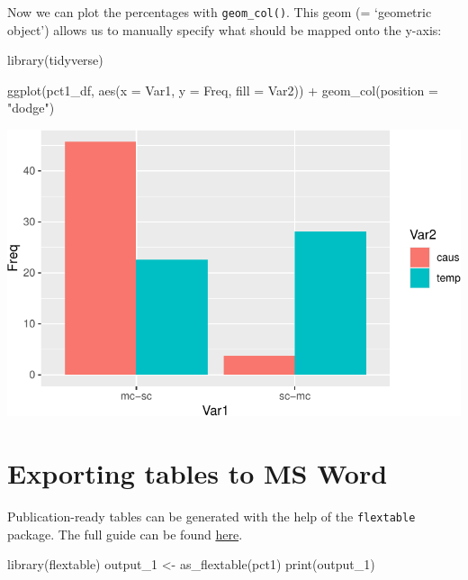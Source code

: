 \documentclass[
  11pt,
  letterpaper,
  DIV=11,
  numbers=noendperiod]{scrreprt}
\newenvironment{Shaded}{\begin{snugshade}}{\end{snugshade}}
\newcommand{\AttributeTok}[1]{\textcolor[rgb]{0.40,0.45,0.13}{#1}}
\newcommand{\FunctionTok}[1]{\textcolor[rgb]{0.28,0.35,0.67}{#1}}
\newcommand{\NormalTok}[1]{\textcolor[rgb]{0.00,0.23,0.31}{#1}}
\newcommand{\OtherTok}[1]{\textcolor[rgb]{0.00,0.23,0.31}{#1}}
\newcommand{\SpecialCharTok}[1]{\textcolor[rgb]{0.37,0.37,0.37}{#1}}
\newcommand{\StringTok}[1]{\textcolor[rgb]{0.13,0.47,0.30}{#1}}
\begin{document}
\begin{tcolorbox}
Now we can plot the percentages with \texttt{geom\_col()}. This geom (=
`geometric object') allows us to manually specify what should be mapped
onto the y-axis:

\begin{Shaded}
\begin{Highlighting}[]
\FunctionTok{library}\NormalTok{(tidyverse)}

\FunctionTok{ggplot}\NormalTok{(pct1\_df, }\FunctionTok{aes}\NormalTok{(}\AttributeTok{x =}\NormalTok{ Var1, }\AttributeTok{y =}\NormalTok{ Freq, }\AttributeTok{fill =}\NormalTok{ Var2)) }\SpecialCharTok{+}
  \FunctionTok{geom\_col}\NormalTok{(}\AttributeTok{position =} \StringTok{"dodge"}\NormalTok{)}
\end{Highlighting}
\end{Shaded}

\includegraphics{Categorical_data_files/figure-pdf/unnamed-chunk-18-1.pdf}

\end{tcolorbox}

\section{Exporting tables to MS Word}\label{exporting-tables-to-ms-word}

Publication-ready tables can be generated with the help of the
\texttt{flextable} package. The full guide can be found
\href{https://ardata-fr.github.io/flextable-book/crosstabs.html\#using-tables}{here}.

\begin{Shaded}
\begin{Highlighting}[]
\FunctionTok{library}\NormalTok{(flextable)}
\NormalTok{output\_1 }\OtherTok{\textless{}{-}} \FunctionTok{as\_flextable}\NormalTok{(pct1)}
\FunctionTok{print}\NormalTok{(output\_1)}
\end{Highlighting}
\end{Shaded}
\end{document}
